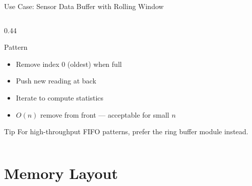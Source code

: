\documentclass[aspectratio=169, 10pt]{beamer}
\begin{document}
\begin{frame}[fragile]{Use Case: Sensor Data Buffer with Rolling Window}
\begin{columns}[T]
\begin{column}{0.44\textwidth}
\vspace{1em}
\begin{block}{Pattern}
\begin{itemize}
  \item Remove index 0 (oldest) when full
  \item Push new reading at back
  \item Iterate to compute statistics
  \item $O(n)$ remove from front --- acceptable for small $n$
\end{itemize}
\end{block}

\vspace{0.3em}
\begin{alertblock}{Tip}
For high-throughput FIFO patterns, prefer
the ring buffer module instead.
\end{alertblock}
\end{column}
\end{columns}
\end{frame}

\section{Memory Layout}
\end{document}
